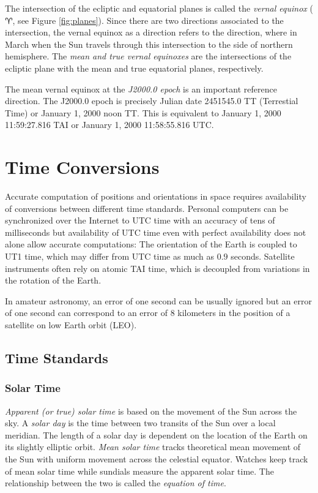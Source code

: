 \documentclass [12pt, a4paper] {article}
\begin{document}
The intersection of the ecliptic and equatorial planes is called the \emph{vernal equinox}
($\aries$, see Figure \ref{fig:planes}).
Since there are two directions associated to the intersection, the vernal equinox as a 
direction refers to the direction, where in March when the Sun travels through this intersection
to the side of northern hemisphere.
The \emph{mean and true vernal equinoxes} are the intersections of the ecliptic plane with 
the mean and true equatorial planes, respectively.

The mean vernal equinox at the \emph{J2000.0 epoch} is an important reference direction.
The J2000.0 epoch is precisely Julian date 2451545.0 TT (Terrestial Time) or January 1, 2000
noon TT. This is equivalent to January 1, 2000 11:59:27.816 TAI or January 1, 2000
11:58:55.816 UTC.


\section{Time Conversions}
Accurate computation of positions and orientations in space requires availability of 
conversions between different time standards. Personal computers can be synchronized 
over the Internet to UTC time with an accuracy of tens of milliseconds but availability 
of UTC time even with perfect availability does not alone allow accurate computations:
The orientation of the Earth is coupled to UT1 time, which may differ from UTC time as 
much as $0.9$ seconds.
Satellite instruments often rely on atomic TAI time, which is decoupled from variations
in the rotation of the Earth.

In amateur astronomy, an error of one second can be usually ignored but an error of
one second can correspond to an error of $8$ kilometers in the position of a satellite
on low Earth orbit (LEO).

\subsection{Time Standards}
\subsubsection{Solar Time}
\emph{Apparent (or true) solar time} is based on the movement of the Sun across the sky.
A \emph{solar day} is the time between two transits of the Sun over a local meridian. The
length of a solar day is dependent on the location of the Earth on its slightly elliptic
orbit. \emph{Mean solar time} tracks theoretical mean movement of the Sun with uniform 
movement across the celestial equator. Watches keep track of mean solar time while sundials
measure the apparent solar time. The relationship between the two is called the 
\emph{equation of time}.
\end{document}
